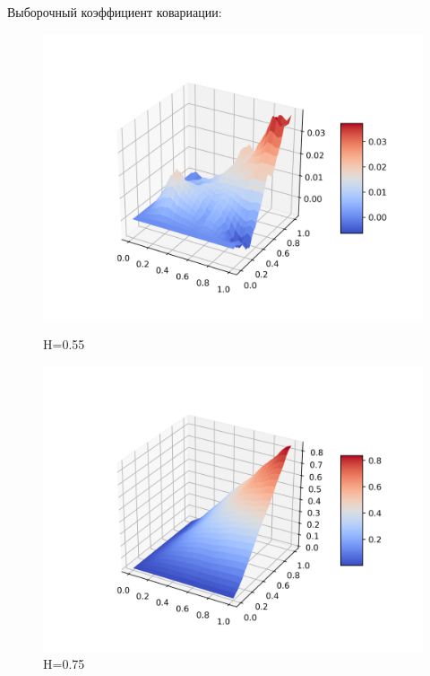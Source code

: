 \documentclass[a4paper,12pt]{article}
\numberwithin{equation}{section}
\begin{document}
	Выборочный коэффициент ковариации:
	\begin{figure}[H]
		\includegraphics[scale=0.4]{covariance-2-55.png}
		\caption{H=0.55}
		\endminipage\hfill
		\includegraphics[scale=0.4]{covariance-2-75.png}
		\caption{H=0.75}
		\endminipage\hfill
	\end{figure}
	
\end{document}
